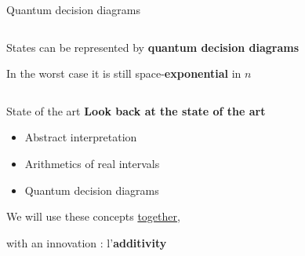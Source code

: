 \begin{frame}{Quantum decision diagrams}
    \begin{columns}
        \begin{column}{0.7\textwidth}
            States can be represented by \textbf{quantum decision diagrams}

            \vspace{1em}

            In the worst case it is still space-\textbf{exponential} in $n$
        \end{column}
    \begin{column}{0.3\textwidth}
        \end{column}
    \end{columns}
\end{frame}

\begin{frame}{State of the art}
    \textbf{Look back at the state of the art}
    \begin{itemize}
        \item[\checkmark] Abstract interpretation
        \item[\checkmark] Arithmetics of real intervals
        \item[\checkmark] Quantum decision diagrams
    \end{itemize}
    \begin{center}
        We will use these concepts \underline{together},

        with an innovation : l'\textbf{additivity}
\vfill
\end{center}
\end{frame}

